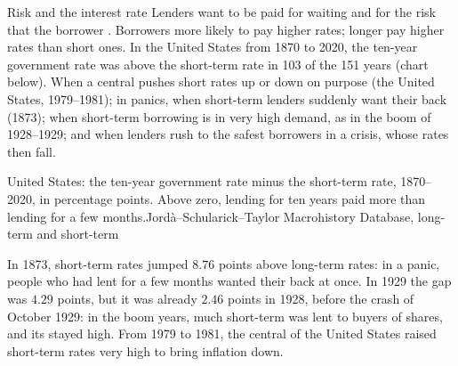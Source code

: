 \begin{model}{Risk and the interest rate}
\assumes Lenders want to be paid for waiting and for the risk that the borrower .
\predicts Borrowers more likely to  pay higher rates; longer  pay higher rates than short
ones.
\tested In the United States from 1870 to 2020, the ten-year government rate was above the short-term
rate in 103 of the 151 years (chart below).
\breaks When a central  pushes short rates up or down on purpose (the United States, 1979--1981);
in panics, when short-term lenders suddenly want their  back (1873); when short-term borrowing
is in very high demand, as in the  boom of 1928--1929; and when lenders rush
to the safest borrowers in a crisis, whose rates then fall.
\end{model}

\begin{omchart}{United States: the ten-year government rate minus the short-term rate, 1870--2020, in
percentage points. Above zero, lending for ten years paid more than lending for a few
months.}{Jord\`a--Schularick--Taylor Macrohistory Database, long-term and short-term }
\end{omchart}

In 1873, short-term rates jumped $8.76$ points above long-term rates: in a panic, people who had lent
for a few months wanted their  back at once. In 1929 the gap was $4.29$ points, but it was
already $2.46$ points in 1928, before the  crash of October 1929: in the boom years, much
short-term  was lent to buyers of shares, and its  stayed high. From 1979 to 1981, the central  of the United States
raised short-term rates very high to bring inflation down.

